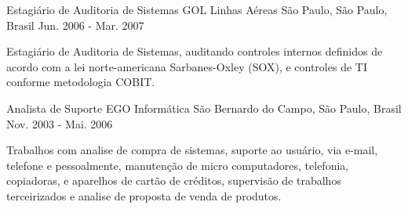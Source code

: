 \begin{cventries}
  \cventry
    {Estagiário de Auditoria de Sistemas} %
    {GOL Linhas Aéreas} %
    {São Paulo, São Paulo, Brasil} %
    {Jun. 2006 - Mar. 2007} %
    {
      \begin{cvitems} %
        \item {Estagiário de Auditoria de Sistemas, auditando controles internos definidos de acordo com a lei norte-americana Sarbanes-Oxley (SOX), e controles de TI conforme metodologia COBIT.}
      \end{cvitems}
    }

  \cventry
    {Analista de Suporte} %
    {EGO Informática} %
    {São Bernardo do Campo, São Paulo, Brasil} %
    {Nov. 2003 - Mai. 2006} %
    {
      \begin{cvitems} %
        \item {Trabalhos com analise de compra de sistemas, suporte ao usuário, via e-mail, telefone e pessoalmente, manutenção de micro computadores, telefonia, copiadoras, e aparelhos de cartão de créditos, supervisão de trabalhos terceirizados e analise de proposta de venda de produtos.}
      \end{cvitems}
    }

\end{cventries}
